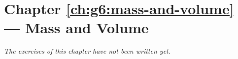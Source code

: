 \section*{Chapter \ref{ch:g6:mass-and-volume} --- Mass and Volume}


\emph{The exercises of this chapter have not been written yet.}

